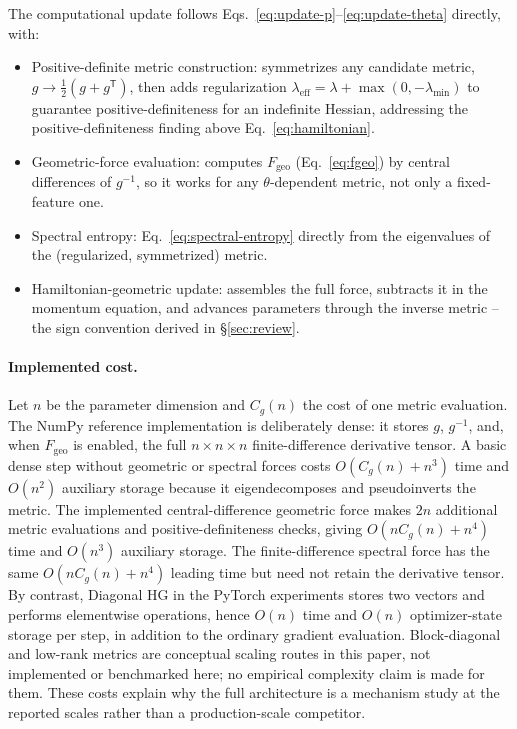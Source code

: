 \documentclass[10pt,twocolumn]{article}
\begin{document}
The computational update follows
Eqs.~\eqref{eq:update-p}--\eqref{eq:update-theta} directly, with:
\begin{itemize}
\item Positive-definite metric construction: symmetrizes any candidate metric,
  $g \to \tfrac12(g+g^{\mathsf T})$, then adds regularization
  $\lambda_{\mathrm{eff}} = \lambda + \max(0,-\lambda_{\min})$ to guarantee
  positive-definiteness for an indefinite Hessian, addressing the
  positive-definiteness finding above Eq.~\eqref{eq:hamiltonian}.
\item Geometric-force evaluation: computes
  $F_{\mathrm{geo}}$ (Eq.~\eqref{eq:fgeo}) by central differences of $g^{-1}$,
  so it works for any $\theta$-dependent metric, not only a fixed-feature one.
\item Spectral entropy: Eq.~\eqref{eq:spectral-entropy} directly from
  the eigenvalues of the (regularized, symmetrized) metric.
\item Hamiltonian-geometric update: assembles the full force, subtracts it in
  the momentum equation, and advances parameters through the inverse metric --
  the sign convention derived in \S\ref{sec:review}.
\end{itemize}

\paragraph{Implemented cost.}
Let $n$ be the parameter dimension and $C_g(n)$ the cost of one metric
evaluation. The NumPy reference implementation is deliberately dense: it
stores $g$, $g^{-1}$, and, when $F_{\mathrm{geo}}$ is enabled, the full
$n\times n\times n$ finite-difference derivative tensor. A basic dense step
without geometric or spectral forces costs $O(C_g(n)+n^3)$ time and $O(n^2)$
auxiliary storage because it eigendecomposes and pseudoinverts the metric.
The implemented central-difference geometric force makes $2n$ additional
metric evaluations and positive-definiteness checks, giving
$O(nC_g(n)+n^4)$ time and $O(n^3)$ auxiliary storage. The finite-difference
spectral force has the same $O(nC_g(n)+n^4)$ leading time but need not retain
the derivative tensor. By contrast, Diagonal HG in the PyTorch experiments
stores two vectors and performs elementwise operations, hence $O(n)$ time
and $O(n)$ optimizer-state storage per step, in addition to the ordinary
gradient evaluation. Block-diagonal and low-rank metrics are conceptual
scaling routes in this paper, not implemented or benchmarked here; no
empirical complexity claim is made for them. These costs explain why the
full architecture is a mechanism study at the reported scales rather than a
production-scale competitor.
\end{document}
